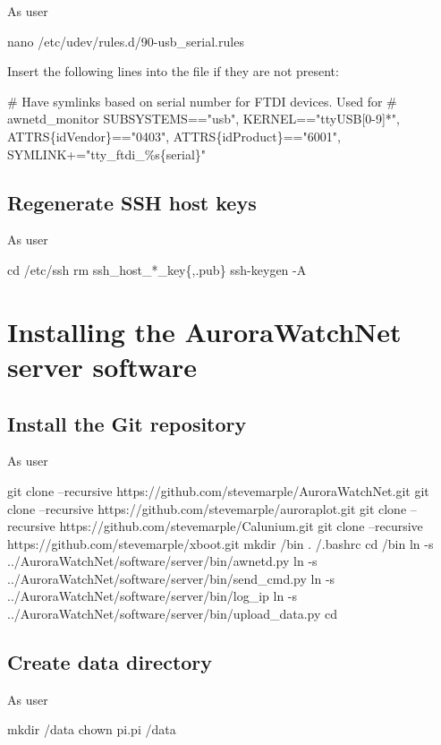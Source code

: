 As user \rootUser
\begin{Cmd}
nano /etc/udev/rules.d/90-usb_serial.rules
\end{Cmd}

Insert the following lines into the file if they are not present:
\begin{Cmd}[fontsize=\relsize{-3}]
# Have symlinks based on serial number for FTDI devices. Used for 
# awnetd_monitor
SUBSYSTEMS=="usb", KERNEL=="ttyUSB[0-9]*", ATTRS\{idVendor\}=="0403", ATTRS\{idProduct\}=="6001", SYMLINK+="tty_ftdi_\%s\{serial\}"  
\end{Cmd}

\subsection{Regenerate SSH host keys}

As user \rootUser
\begin{Cmd}
cd /etc/ssh
rm ssh_host_*_key\{,.pub\}
ssh-keygen -A
\end{Cmd}

\newpage
\section{Installing the AuroraWatchNet server software}

\subsection{Install the Git repository}
As user \piUser
\begin{Cmd}
git clone --recursive https://github.com/stevemarple/AuroraWatchNet.git 
git clone --recursive https://github.com/stevemarple/auroraplot.git
git clone --recursive https://github.com/stevemarple/Calunium.git
git clone --recursive https://github.com/stevemarple/xboot.git
mkdir \mytilde/bin
. \mytilde/.bashrc
cd \mytilde/bin
ln -s ../AuroraWatchNet/software/server/bin/awnetd.py
ln -s ../AuroraWatchNet/software/server/bin/send_cmd.py
ln -s ../AuroraWatchNet/software/server/bin/log_ip
ln -s ../AuroraWatchNet/software/server/bin/upload_data.py
cd \mytilde
\end{Cmd}

\subsection{Create data directory}
As user \rootUser
\begin{Cmd}
mkdir /data
chown pi.pi /data
\end{Cmd}

